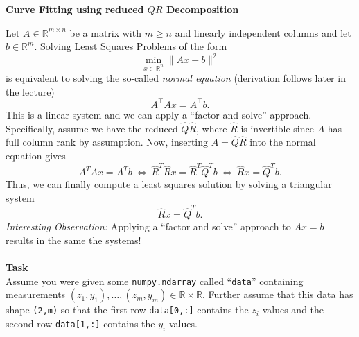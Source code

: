 \textbf{Curve Fitting using reduced $QR$ Decomposition}

{
\color{navy}
Let $A \in \mathbb{R}^{m\times n}$ be a matrix with $m\geq n$ and linearly independent columns and let $b \in \mathbb{R}^m$. Solving Least Squares Problems of the form
$$\min_{x\in\mathbb{R}^n} \|Ax-b\|^2$$
is equivalent to solving the so-called \textit{normal equation} (derivation follows later in the lecture)
$$A^\top A x = A^\top b. $$
This is a linear system and we can apply a ``factor and solve'' approach. Specifically, assume we have the reduced $\widehat{Q}\widehat{R}$, where $\widehat{R}$ is invertible since $A$ has full column rank by assumption.
Now, inserting $A=\widehat{Q}\widehat{R}$ into the normal equation gives
$$A^TAx=A^Tb~\Leftrightarrow~\widehat{R}^T\widehat{R}x=\widehat{R}^T\widehat{Q}^Tb~\Leftrightarrow~\widehat{R}x=\widehat{Q}^Tb.$$
Thus, we can finally compute a least squares solution by solving a triangular system
$$\widehat{R}x = \widehat{Q}^Tb.$$
\textit{Interesting Observation:} Applying a ``factor and solve'' approach to $Ax=b$ results in the same the systems!
}
~\\~\\
\textbf{Task}\\
Assume you were given some \verb|numpy.ndarray| called ``\verb|data|'' containing measurements $(z_1,y_1),\ldots, (z_m,y_m) \in \mathbb{R}\times\mathbb{R}$. Further assume that this data has shape \verb|(2,m)| so that the first row \verb|data[0,:]| contains the $z_i$ values and the second row \verb|data[1,:]| contains the $y_i$ values.
